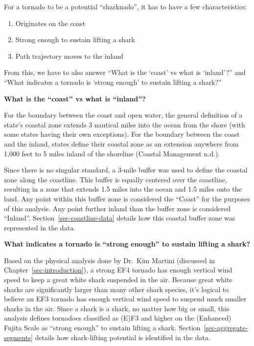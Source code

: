 \documentclass[
  letterpaper,
  DIV=11,
  numbers=noendperiod]{scrreprt}
\providecommand{\tightlist}{%
  \setlength{\itemsep}{0pt}\setlength{\parskip}{0pt}}
\begin{document}
For a tornado to be a potential ``sharknado'', it has to have a few
characteristics:

\begin{enumerate}
\def\labelenumi{\arabic{enumi}.}
\tightlist
\item
  Originates on the coast
\item
  Strong enough to sustain lifting a shark
\item
  Path trajectory moves to the inland
\end{enumerate}

From this, we have to also answer ``What is the `coast' vs what is
`inland'?'' and ``What indicates a tornado is `strong enough' to sustain
lifting a shark?''

\textbf{What is the ``coast'' vs what is ``inland''?}

For the boundary between the coast and open water, the general
definition of a state's coastal zone extends 3 nautical miles into the
ocean from the shore (with some states having their own exceptions). For
the boundary between the coast and the inland, states define their
coastal zone as an extension anywhere from 1,000 feet to 5 miles inland
of the shoreline (Coastal Management n.d.).

Since there is no singular standard, a 3-mile buffer was used to define
the coastal zone along the coastline. This buffer is equally centered
over the coastline, resulting in a zone that extends 1.5 miles into the
ocean and 1.5 miles onto the land. Any point within this buffer zone is
considered the ``Coast'' for the purposes of this analysis. Any point
further inland than the buffer zone is considered ``Inland''.
Section~\ref{sec-coastline-data} details how this coastal buffer zone
was represented in the data.

\textbf{What indicates a tornado is ``strong enough'' to sustain lifting
a shark?}

Based on the physical analysis done by Dr.~Kim Martini (discussed in
Chapter~\ref{sec-introduction}), a strong EF4 tornado has enough
vertical wind speed to keep a great white shark suspended in the air.
Because great white sharks are significantly larger than many other
shark species, it's logical to believe an EF3 tornado has enough
vertical wind speed to suspend much smaller sharks in the air. Since a
shark is a shark, no matter how big or small, this analysis defines
tornadoes classified as (E)F3 and higher on the (Enhanced) Fujita Scale
as ``strong enough'' to sustain lifting a shark.
Section~\ref{sec-aggregate-segments} details how shark-lifting potential
is identified in the data.
\end{document}
